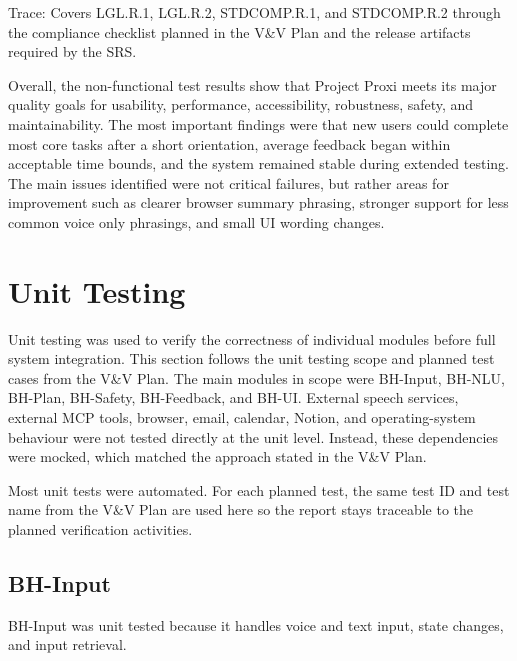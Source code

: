 \documentclass[12pt]{article}
\begin{document}
\noindent Trace: Covers LGL.R.1, LGL.R.2, STDCOMP.R.1, and STDCOMP.R.2
through the compliance checklist planned in the V\&V Plan and the
release artifacts required by the SRS.


Overall, the non-functional test results show that Project Proxi meets
its major quality goals for usability, performance, accessibility,
robustness, safety, and maintainability. The most important findings
were that new users could complete most core tasks after a short
orientation, average feedback began within acceptable time bounds, and
the system remained stable during extended testing. The main issues
identified were not critical failures, but rather areas for
improvement such as clearer browser summary phrasing, stronger support
for less common voice only phrasings, and small UI wording changes.

\section{Unit Testing}

Unit testing was used to verify the correctness of individual modules
before full system integration. This section follows the unit testing
scope and planned test cases from the V\&V Plan. The main modules in
scope were BH-Input, BH-NLU, BH-Plan, BH-Safety, BH-Feedback, and
BH-UI. External speech services, external MCP tools, browser, email,
calendar, Notion, and operating-system behaviour were not tested
directly at the unit level. Instead, these dependencies were mocked,
which matched the approach stated in the V\&V Plan.

Most unit tests were automated. For each planned test, the same test
ID and test name from the V\&V Plan are used here so the report stays
traceable to the planned verification activities.

\subsection{BH-Input}

BH-Input was unit tested because it handles voice and text input,
state changes, and input retrieval.
\end{document}
